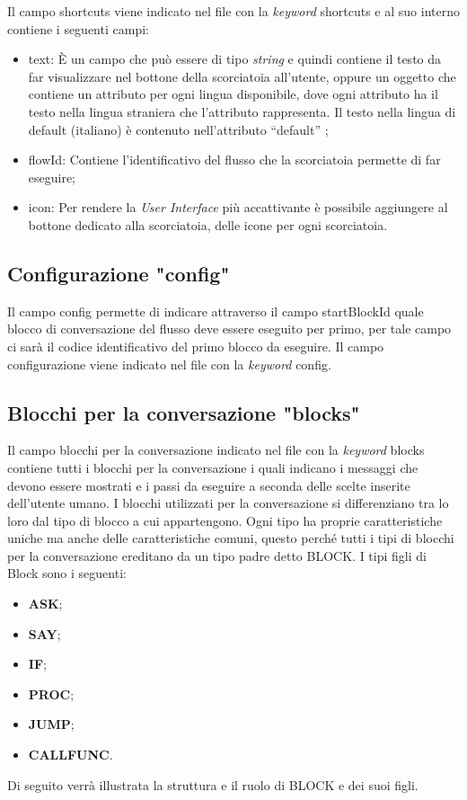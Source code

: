 Il campo shortcuts viene indicato nel file con la \emph{keyword} shortcuts
e al suo interno contiene i seguenti campi:
\begin{itemize}
	\item text: È un campo che può essere di tipo \emph{string} e quindi contiene il testo da far visualizzare nel bottone della scorciatoia all'utente, oppure un oggetto che contiene un attributo per ogni lingua disponibile, dove ogni attributo ha il testo nella lingua straniera che l'attributo rappresenta. Il testo nella lingua di default (italiano) è contenuto nell’attributo “default” ;
	\item flowId: Contiene l'identificativo del flusso che la scorciatoia permette di far eseguire;
	\item icon: Per rendere la \emph{User Interface} più accattivante è possibile aggiungere al bottone dedicato alla scorciatoia, delle icone per ogni scorciatoia.
\end{itemize}

\subsection{Configurazione "config"}
Il campo config permette di indicare attraverso il campo startBlockId quale blocco di conversazione del flusso deve essere eseguito per primo, per tale campo ci sarà il codice identificativo del primo blocco da eseguire. Il campo configurazione viene indicato nel file con la \emph{keyword} config.

\subsection{Blocchi per la conversazione "blocks"}
Il campo blocchi per la conversazione indicato nel file con la \emph{keyword} blocks contiene tutti i blocchi per la conversazione i quali indicano i messaggi che devono essere mostrati e i passi da eseguire a seconda delle scelte inserite dell'utente umano.
I blocchi utilizzati per la conversazione si differenziano tra lo loro dal tipo di blocco a cui appartengono. Ogni tipo ha proprie caratteristiche uniche ma anche delle caratteristiche comuni, questo perché tutti i tipi di blocchi per la conversazione ereditano da un tipo padre detto BLOCK. I tipi figli di Block sono i seguenti:
\begin{itemize}
	\item\textbf{ASK};
	\item\textbf{SAY};
	\item\textbf{IF};
	\item\textbf{PROC};
	\item\textbf{JUMP};
	\item\textbf{CALLFUNC}.
\end{itemize}
Di seguito verrà illustrata la struttura e il ruolo di BLOCK e dei suoi figli.
